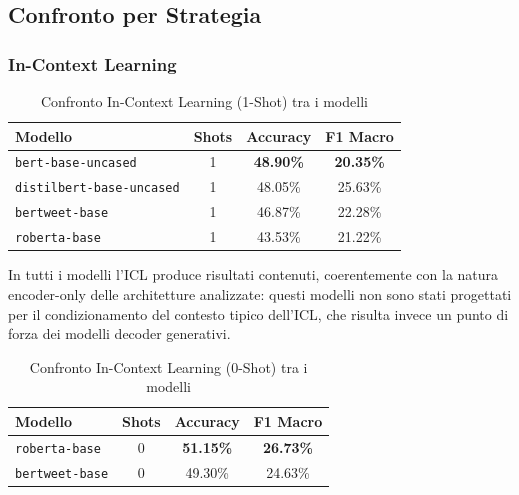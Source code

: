 \documentclass[a4paper,12pt]{article}
\begin{document}
\subsection{Confronto per Strategia}

\subsubsection{In-Context Learning}

\begin{table}[H]
    \centering
    \renewcommand{\arraystretch}{1.3}
    \begin{tabular}{|l|c|c|c|}
        \hline
        \textbf{Modello}                 & \textbf{Shots} & \textbf{Accuracy} & \textbf{F1 Macro} \\
        \hline
        \texttt{bert-base-uncased}       & 1              & \textbf{48.90\%}  & \textbf{20.35\%}  \\
        \texttt{distilbert-base-uncased} & 1              & 48.05\%           & 25.63\%           \\
        \texttt{bertweet-base}           & 1              & 46.87\%           & 22.28\%           \\
        \texttt{roberta-base}            & 1              & 43.53\%           & 21.22\%           \\
        \hline
    \end{tabular}
    \caption{Confronto In-Context Learning (1-Shot) tra i modelli}
\end{table}

In tutti i modelli l'ICL produce risultati contenuti, coerentemente con la natura encoder-only delle architetture analizzate: questi modelli non sono stati progettati per il condizionamento del contesto tipico dell'ICL, che risulta invece un punto di forza dei modelli decoder generativi.

\begin{table}[H]
    \centering
    \renewcommand{\arraystretch}{1.3}
    \begin{tabular}{|l|c|c|c|}
        \hline
        \textbf{Modello}       & \textbf{Shots} & \textbf{Accuracy} & \textbf{F1 Macro} \\
        \hline
        \texttt{roberta-base}  & 0              & \textbf{51.15\%}  & \textbf{26.73\%}  \\
        \texttt{bertweet-base} & 0              & 49.30\%           & 24.63\%           \\
        \hline
    \end{tabular}
    \caption{Confronto In-Context Learning (0-Shot) tra i modelli}
\end{table}
\end{document}
